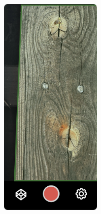 \begin{figure}[ht]
  \centering
    \begin{subfigure}[b]{0.4\textwidth}
      \centering
        \includegraphics[width=0.55\textwidth]{Master Thesis/Images/Section_3/Mock/3-Mock2.png}
    \end{subfigure}
    \begin{subfigure}[b]{0.4\textwidth}
      \centering

\end{subfigure}
\end{figure}
